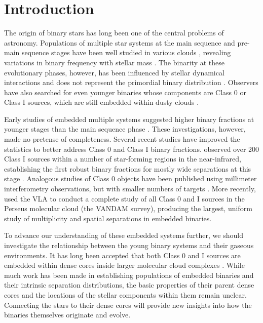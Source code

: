 \documentclass[usenatbib,a4paper]{mnras}
\begin{document}

\section{Introduction\label{Intro}}


The origin of binary stars has long been one of the central problems of astronomy.  Populations of multiple star systems at the main sequence and pre-main sequence stages have been well studied in various clouds \citep[e.g.,][]{Duquennoy91, Raghavan10, Kraus11}, revealing variations in binary frequency with stellar mass \citep{Lada06, DucheneKraus13}.  The binarity at these evolutionary phases, however, has been influenced by stellar dynamical interactions and does not represent the primordial binary distribution \citep[e.g.,][]{MarksKroupa12, Reipurth14}.  Observers have also searched for even younger binaries whose components are Class 0 or Class I sources, which are still embedded within dusty clouds \citep[e.g.,][]{LadaWilking84, Andre93, Greene94}.  

Early studies of embedded multiple systems suggested higher binary fractions at younger stages than the main sequence phase \citep[e.g.,][]{Reipurth00, Looney00, Haisch04, Duchene04}.  These investigations, however, made no pretense of completeness.  Several recent studies have improved the statistics to better address Class 0 and Class I binary fractions.  \citet{Connelley08} observed over 200 Class I sources within a number of star-forming regions in the near-infrared, establishing the first robust binary fractions for mostly wide separations at this stage \citep{Duchene07, Connelley09}.  Analogous studies of Class 0 objects have been published using millimeter interferometry observations, but with smaller numbers of targets \citep{Maury10, Chen13}.  More recently, \citet{Tobin16} used the VLA to conduct a complete study of all Class 0 and I sources in the Perseus molecular cloud (the VANDAM survey), producing the largest, uniform study of multiplicity and spatial separations in embedded binaries.

To advance our understanding of these embedded systems further, we should investigate the relationship between the young binary systems and their gaseous environments.  It has long been accepted that both Class 0 and I sources are embedded within dense cores inside larger molecular cloud complexes \citep[e.g., see ][for review]{difran07, Andre14}.  While much work has been made in establishing populations of embedded binaries and their intrinsic separation distributions, the basic properties of their parent dense cores and the locations of the stellar components within them remain unclear.   Connecting the stars to their dense cores will provide new insights into how the binaries themselves originate and evolve.
\end{document}
